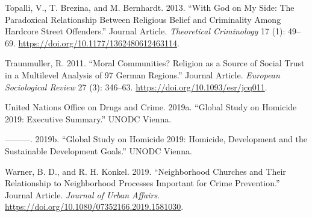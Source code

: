 \documentclass[smallextended]{svjour3}       %
\begin{document}
\leavevmode\hypertarget{ref-Topalli2013god}{}%
Topalli, V., T. Brezina, and M. Bernhardt. 2013. ``With God on My Side:
The Paradoxical Relationship Between Religious Belief and Criminality
Among Hardcore Street Offenders.'' Journal Article. \emph{Theoretical
Criminology} 17 (1): 49--69.
\url{https://doi.org/10.1177/1362480612463114}.

\leavevmode\hypertarget{ref-Traunmuller2011moral}{}%
Traunmuller, R. 2011. ``Moral Communities? Religion as a Source of
Social Trust in a Multilevel Analysis of 97 German Regions.'' Journal
Article. \emph{European Sociological Review} 27 (3): 346--63.
\url{https://doi.org/10.1093/esr/jcq011}.

\leavevmode\hypertarget{ref-Unodc2019executive}{}%
United Nations Office on Drugs and Crime. 2019a. ``Global Study on
Homicide 2019: Executive Summary.'' UNODC Vienna.

\leavevmode\hypertarget{ref-Unodc2019development}{}%
---------. 2019b. ``Global Study on Homicide 2019: Homicide, Development
and the Sustainable Development Goals.'' UNODC Vienna.

\leavevmode\hypertarget{ref-Warner2019neighborhood}{}%
Warner, B. D., and R. H. Konkel. 2019. ``Neighborhood Churches and Their
Relationship to Neighborhood Processes Important for Crime Prevention.''
Journal Article. \emph{Journal of Urban Affairs}.
\url{https://doi.org/10.1080/07352166.2019.1581030}.



\end{document}
